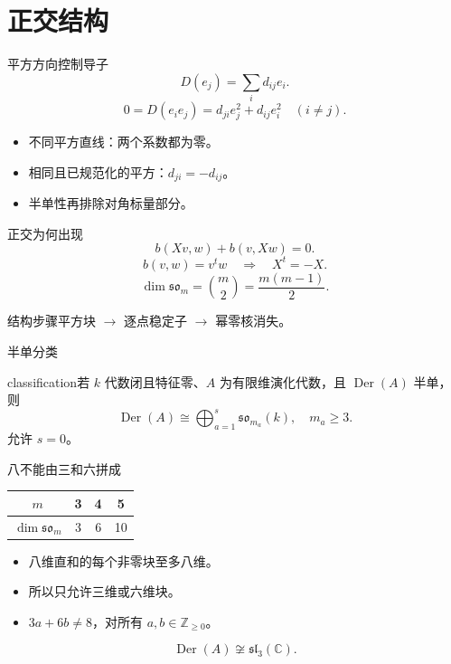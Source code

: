 \documentclass{beamer}
\begin{document}
\section{正交结构}
\begin{frame}{平方方向控制导子}
\[D(e_j)=\sum_i d_{ij}e_i.\]\[0=D(e_ie_j)=d_{ji}e_j^2+d_{ij}e_i^2\quad(i\ne j).\]\begin{itemize}\item 不同平方直线：两个系数都为零。\item 相同且已规范化的平方：$d_{ji}=-d_{ij}$。\item 半单性再排除对角标量部分。\end{itemize}
\end{frame}
\begin{frame}{正交为何出现}
\[b(Xv,w)+b(v,Xw)=0.\]\[b(v,w)=v^tw\quad\Longrightarrow\quad X^t=-X.\]\[\dim\mathfrak{so}_m=\binom m2=\frac{m(m-1)}2.\]\begin{block}{结构步骤}平方块 $\to$ 逐点稳定子 $\to$ 幂零核消失。\end{block}
\end{frame}
\begin{frame}{半单分类}
\begin{bookresult}{classification}若 $k$ 代数闭且特征零、$A$ 为有限维演化代数，且 $\operatorname{Der}(A)$ 半单，则\[\operatorname{Der}(A)\cong\bigoplus_{a=1}^{s}\mathfrak{so}_{m_a}(k),\quad m_a\ge3.\]允许 $s=0$。\end{bookresult}
\end{frame}
\begin{frame}{八不能由三和六拼成}
\begin{center}\begin{tabular}{c|ccc}$m$&3&4&5\\\hline$\dim\mathfrak{so}_m$&3&6&10\end{tabular}\end{center}\begin{itemize}\item 八维直和的每个非零块至多八维。\item 所以只允许三维或六维块。\item $3a+6b\ne8$，对所有 $a,b\in\mathbb Z_{\ge0}$。\end{itemize}\[\operatorname{Der}(A)\not\cong\mathfrak{sl}_3(\mathbb C).\]
\end{frame}
\end{document}
